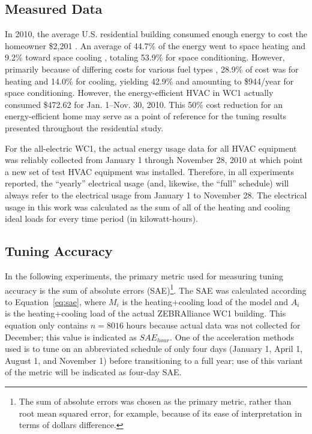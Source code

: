 \documentclass[preprint, review, 12pt]{elsarticle}
\begin{document}
\subsection{Measured Data}
In 2010, the average U.S. residential building consumed enough energy to cost the homeowner \$2,201 \cite{cit:doe2012a}. An average of 44.7\% of the energy went to space heating and 9.2\% toward space cooling \cite{cit:doe2012b}, totaling 53.9\% for space conditioning. However, primarily because of differing costs for various fuel types \cite{cit:doe2012c}, 28.9\% of cost was for heating and 14.0\% for cooling, yielding 42.9\% and amounting to \$944/year for space conditioning. However, the energy-efficient HVAC in WC1 actually consumed \$472.62 for Jan. 1--Nov. 30, 2010. This 50\% cost reduction for an energy-efficient home may serve as a point of reference for the tuning results presented throughout the residential study.

For the all-electric WC1, the actual energy usage data for all HVAC equipment was reliably collected from January 1 through November 28, 2010 at which point a new set of test HVAC equipment was installed. Therefore, in all experiments reported, the ``yearly'' electrical usage (and, likewise, the ``full'' schedule) will always refer to the electrical usage from January 1 to November 28. The electrical usage in this work was calculated as the sum of all of the heating and cooling ideal loads for every time period (in kilowatt-hours).

\subsection{Tuning Accuracy}
In the following experiments, the primary metric used for measuring tuning accuracy is the sum of absolute errors (SAE)\footnote{The sum of absolute errors was chosen as the primary metric, rather than root mean squared error, for example, because of its ease of interpretation in terms of dollars difference.}. The SAE was calculated according to Equation~\ref{eq:sae}, where $M_i$ is the heating+cooling load of the model and $A_i$ is the heating+cooling load of the actual ZEBRAlliance WC1 building. This equation only contains $n=8016$ hours because actual data was not collected for December; this value is indicated as $SAE_{hour}$. One of the acceleration methods used is to tune on an abbreviated schedule of only four days (January 1, April 1, August 1, and November 1) before transitioning to a full year; use of this variant of the metric will be indicated as four-day SAE.
\end{document}
